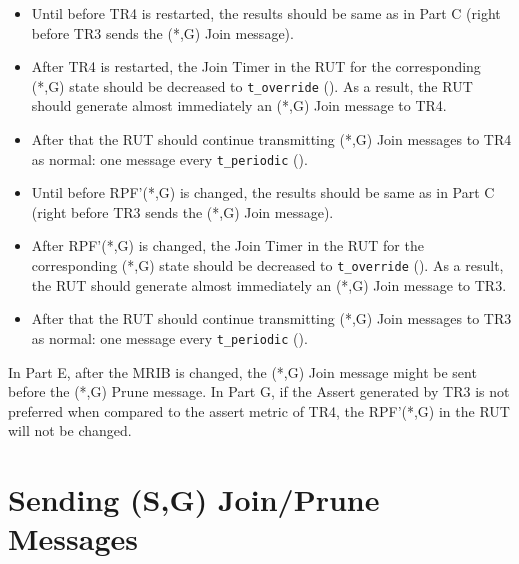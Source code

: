 \documentclass[11pt]{report}
\begin{document}

\begin{itemize}

  \item Until before TR4 is restarted, the results should
  be same as in Part C (right before TR3 sends the (*,G) Join message).

  \item After TR4 is restarted,
  the Join Timer in the RUT for the corresponding (*,G) state
  should be decreased to \verb=t_override= ({\PimsmTOverride}). As a result,
  the RUT should generate almost immediately an (*,G) Join message to TR4.

  \item After that the RUT should continue transmitting 
  (*,G) Join messages to TR4 as normal: one message every \verb=t_periodic=
  ({\PimsmTPeriodic}).

\end{itemize}


\begin{itemize}

  \item Until before RPF'(*,G) is changed, the results should
  be same as in Part C (right before TR3 sends the (*,G) Join message).

  \item After RPF'(*,G) is changed,
  the Join Timer in the RUT for the corresponding (*,G) state
  should be decreased to \verb=t_override= ({\PimsmTOverride}). As a result,
  the RUT should generate almost immediately an (*,G) Join message to TR3.

  \item After that the RUT should continue transmitting 
  (*,G) Join messages to TR3 as normal: one message every \verb=t_periodic=
  ({\PimsmTPeriodic}).

\end{itemize}


In Part E, after the MRIB is changed, the (*,G) Join message might
be sent before the (*,G) Prune message. In Part G, if the Assert generated by
TR3 is not preferred when compared to the assert metric of TR4, the RPF'(*,G)
in the RUT will not be changed.

\newpage
\section{Sending (S,G) Join/Prune Messages}
\end{document}

